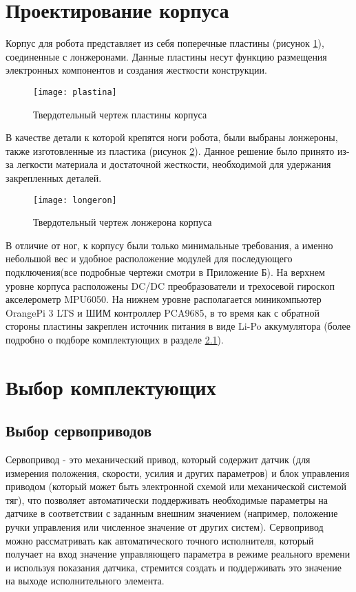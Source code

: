 \newpage
\section{Проектирование корпуса}\label{C4_3}

Корпус для робота представляет из себя поперечные пластины (рисунок \ref{plastina}), соединенные с лонжеронами. Данные пластины несут функцию размещения электронных компонентов и создания жесткости конструкции. 

\begin{figure}[h!]
	\begin{center}
		\texttt{[image: plastina]}
		\caption{Твердотельный чертеж пластины корпуса}
		\label{plastina}
	\end{center}
\end{figure}

В качестве детали к которой крепятся ноги робота, были выбраны лонжероны, также изготовленные из пластика (рисунок \ref{longeron}). Данное решение было принято из-за легкости материала и достаточной жесткости, необходимой для удержания закрепленных деталей. 

\begin{figure}[h!]
	\begin{center}
		\texttt{[image: longeron]}
		\caption{Твердотельный чертеж лонжерона корпуса}
		\label{longeron}
	\end{center}
\end{figure}
\pagebreak
В отличие от ног, к корпусу были только минимальные требования, а именно небольшой вес и удобное расположение модулей для последующего подключения(все подробные чертежи смотри в Приложение Б). На верхнем уровне корпуса расположены DC/DC преобразователи и трехосевой гироскоп акселерометр MPU6050. На нижнем уровне располагается миникомпьютер OrangePi 3 LTS и ШИМ контроллер PCA9685, в то время как с обратной стороны пластины закреплен источник питания в виде Li-Po аккумулятора (более подробно о подборе комплектующих в разделе \ref{C4_4_1}).


\section{Выбор комплектующих}\label{C4_4}
	\subsection{Выбор сервоприводов}\label{C4_4_1}
	
Сервопривод - это механический привод, который содержит датчик (для измерения положения, скорости, усилия и других параметров) и блок управления приводом (который может быть электронной схемой или механической системой тяг), что позволяет автоматически поддерживать необходимые параметры на датчике в соответствии с заданным внешним значением (например, положение ручки управления или численное значение от других систем). Сервопривод можно рассматривать как автоматического точного исполнителя, который получает на вход значение управляющего параметра в режиме реального времени и используя показания датчика, стремится создать и поддерживать это значение на выходе исполнительного элемента. 

